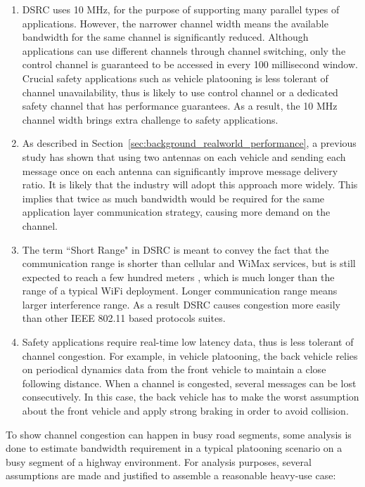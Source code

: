 \documentclass[12pt]{report}
\begin{document}
\begin{enumerate}
  \item DSRC uses 10 MHz, for the purpose of supporting many parallel types of applications. However, the narrower channel width means the available bandwidth for the same channel is significantly reduced. Although applications can use different channels through channel switching, only the control channel is guaranteed to be accessed in every 100 millisecond window. Crucial safety applications such as vehicle platooning is less tolerant of channel unavailability, thus is likely to use control channel or a dedicated safety channel that has performance guarantees. As a result, the 10 MHz channel width brings extra challenge to safety applications.
  \item As described in Section~\ref{sec:background_realworld_performance}, a previous study \cite{songDSRC2016} has shown that using two antennas on each vehicle and sending each message once on each antenna can significantly improve message delivery ratio. It is likely that the industry will adopt this approach more widely. This implies that twice as much bandwidth would be required for the same application layer communication strategy, causing more demand on the channel.
  \item The term ``Short Range" in DSRC is meant to convey the fact that the communication range is shorter than cellular and WiMax services, but is still expected to reach a few hundred meters \cite{kenney2011}, which is much longer than the range of a typical WiFi deployment. Longer communication range means larger interference range. As a result DSRC causes congestion more easily than other IEEE 802.11 based protocols suites.
  \item Safety applications require real-time low latency data, thus is less tolerant of channel congestion. For example, in vehicle platooning, the back vehicle relies on periodical dynamics data from the front vehicle to maintain a close following distance. When a channel is congested, several messages can be lost consecutively. In this case, the back vehicle has to make the worst assumption about the front vehicle and apply strong braking in order to avoid collision.
\end{enumerate}

To show channel congestion can happen in busy road segments, some analysis is done to estimate bandwidth requirement in a typical platooning scenario on a busy segment of a highway environment. For analysis purposes, several assumptions are made and justified to assemble a reasonable heavy-use case:
\end{document}
